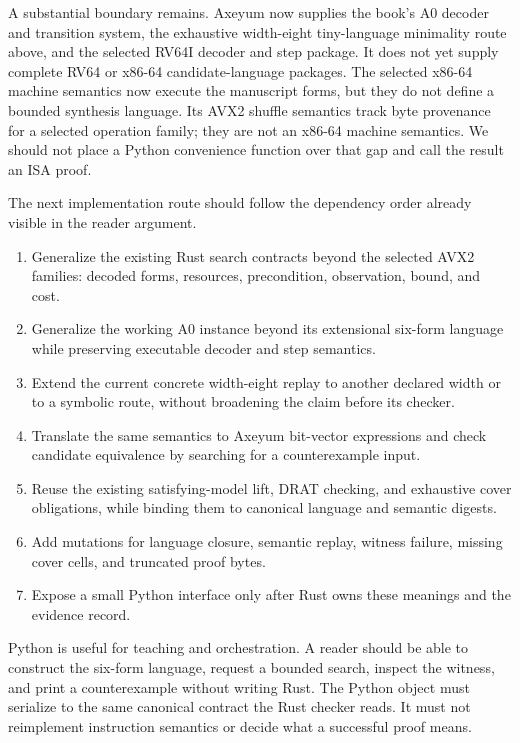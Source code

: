 A substantial boundary remains. Axeyum now supplies the book's A0
decoder and transition system, the exhaustive width-eight tiny-language
minimality route above, and the selected RV64I decoder and step package.
It does not yet supply complete RV64 or x86-64 candidate-language packages.
The selected x86-64 machine semantics now execute the manuscript forms, but
they do not define a bounded synthesis language. Its AVX2 shuffle semantics track
byte provenance for a selected operation family; they are not an x86-64
machine semantics. We should not place a Python convenience function over
that gap and call the result an ISA proof.

The next implementation route should follow the dependency order already
visible in the reader argument.

\begin{enumerate}
\item Generalize the existing Rust search contracts beyond the selected AVX2
families: decoded forms, resources, precondition, observation, bound, and cost.
\item Generalize the working A0 instance beyond its extensional six-form
language while preserving executable decoder and step semantics.
\item Extend the current concrete width-eight replay to another declared width
or to a symbolic route, without broadening the claim before its checker.
\item Translate the same semantics to Axeyum bit-vector expressions and check
candidate equivalence by searching for a counterexample input.
\item Reuse the existing satisfying-model lift, DRAT checking, and exhaustive
cover obligations, while binding them to canonical language and semantic
digests.
\item Add mutations for language closure, semantic replay, witness failure,
missing cover cells, and truncated proof bytes.
\item Expose a small Python interface only after Rust owns these meanings and
the evidence record.
\end{enumerate}

Python is useful for teaching and orchestration. A reader should be able to
construct the six-form language, request a bounded search, inspect the
witness, and print a counterexample without writing Rust. The Python object
must serialize to the same canonical contract the Rust checker reads. It
must not reimplement instruction semantics or decide what a successful proof
means.

